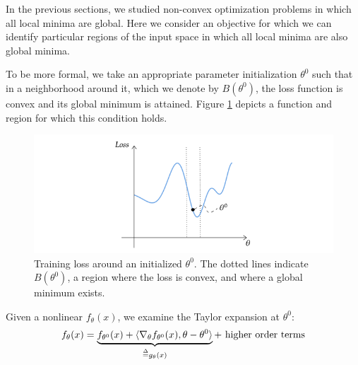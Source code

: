


In the previous sections, we studied non-convex optimization problems in which all local minima are global. Here we consider an objective for which we can identify particular regions of the input space in which all local minima are also global minima. 

To be more formal, we take an appropriate parameter initialization $\theta^0$ such that in a neighborhood around it, which we denote by $B(\theta^0)$, the loss function is convex and its global minimum is attained. Figure \ref{lec13:fig:NTKapproach} depicts a function and region for which this condition holds. 

\begin{figure}[ht]
    \centering
    \includegraphics[scale=0.5]{figures/ntk_initialization.png}
    \caption{Training loss around an initialized $\theta^0$. The dotted lines indicate $B(\theta^0)$, a region where the loss is convex, and where a global minimum exists.
    }
    \label{lec13:fig:NTKapproach}
\end{figure}


Given a nonlinear $f_\theta(x)$, we examine the Taylor expansion at $\theta^0$: 
\begin{align} 
    f_\theta(x) = \underbrace{f_{\theta^0}(x) + \langle \nabla_\theta f_{\theta^0}(x),\theta-\theta^0 \rangle}_{\defeq g_\theta(x)} + \text{ higher order terms}
\end{align} 

